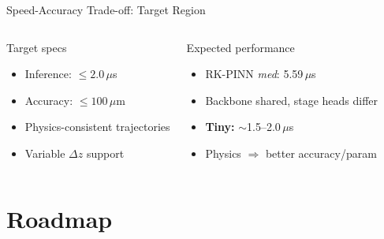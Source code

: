 \documentclass[aspectratio=169, 11pt]{beamer}
\begin{document}
\begin{frame}{Speed-Accuracy Trade-off: Target Region}
\begin{columns}[T]
    \begin{block}{Target specs}
      \begin{itemize}\setlength{\itemsep}{1pt}
        \item Inference: $\leq 2.0$\,$\mu$s
        \item Accuracy: $\leq 100$\,$\mu$m
        \item Physics-consistent trajectories
        \item Variable $\Delta z$ support
      \end{itemize}
    \end{block}

    \begin{exampleblock}{Expected performance}
      \begin{itemize}\setlength{\itemsep}{1pt}
        \item RK-PINN \textit{med}: 5.59\,$\mu$s
        \item Backbone shared, stage heads differ
        \item \textbf{Tiny:} $\sim$1.5--2.0\,$\mu$s
        \item Physics $\Rightarrow$ better accuracy/param
      \end{itemize}
    \end{exampleblock}
  \end{columns}
\end{frame}

\section{Roadmap}
\end{document}
